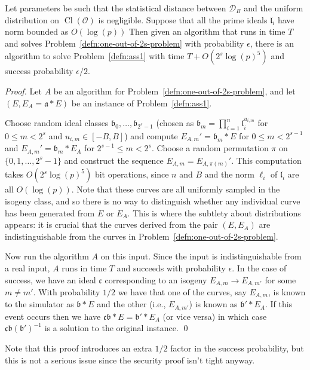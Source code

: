 \documentclass{llncs}
\newcommand{\D}{\mathcal{D}}
\newcommand{\OO}{\mathcal{O}}
\DeclareMathOperator{\Cl}{Cl}
\renewcommand{\a}{\mathfrak{a}}
\renewcommand{\b}{\mathfrak{b}}
\renewcommand{\c}{\mathfrak{c}}
\renewcommand{\l}{\mathfrak{l}}
\begin{document}
\begin{lemma}
Let parameters be such that the statistical distance between $\D_B$ and the uniform distribution on $\Cl(\OO)$ is negligible.
Suppose that all the prime ideals $\l_i$ have norm bounded as $O( \log(p) )$
Then given an algorithm that runs in time $T$ and solves Problem~\ref{defn:one-out-of-2s-problem} with probability $\epsilon$, there is an algorithm to solve Problem~\ref{defn:ass1} with time $T + O( 2^s \log(p)^5 )$ and success probability $\epsilon/2$.
\end{lemma}

\begin{proof}
Let $A$ be an algorithm for Problem~\ref{defn:one-out-of-2s-problem}, and let $(E, E_A = \a * E )$ be an instance of Problem~\ref{defn:ass1}.

Choose random ideal classes $\b_0, \dots, \b_{2^s-1}$
(chosen as $\b_m = \prod_{i=1}^n \l_i^{u_{i,m}}$ for $0 \le m < 2^s$ and $u_{i,m} \in [-B,B]$)
and compute $E_{A,m}' = \b_m * E$ for $0 \le m < 2^{s-1}$ and $E_{A,m}' = \b_m * E_A$ for $2^{s-1} \le m < 2^s$. Choose a random permutation $\pi$ on $\{ 0, 1, \dots, 2^s-1 \}$ and construct the sequence $E_{A,m} = E_{A,\pi(m)}'$.
This computation takes $O( 2^s \log(p)^5 )$ bit operations, since $n$ and $B$ and the norm $\ell_i$ of $\l_i$ are all $O( \log(p) )$.
Note that these curves are all uniformly sampled in the isogeny class, and so there is no way to distinguish whether any individual curve has been generated from $E$ or $E_A$.
This is where the subtlety about distributions appears: it is crucial that the curves derived from the pair $(E, E_A)$ are indistinguishable from the curves in Problem~\ref{defn:one-out-of-2s-problem}.

Now run the algorithm $A$ on this input. Since the input is indistinguishable from a real input, $A$ runs in time $T$ and succeeds with probability $\epsilon$.
In the case of success, we have an ideal $\c$ corresponding to an isogeny $E_{A,m} \to E_{A,m'}$ for some $m \ne m'$.
With probability $1/2$ we have that one of the curves, say $E_{A,m}$, is known to the simulator as  $\b * E$ and the other (i.e., $E_{A,m'}$) is known as $\b' * E_A$. If this event occurs then we have $\c \b * E = \b' * E_A$ (or vice versa) in which case $\c \b (\b')^{-1}$ is a solution to the original instance. \qed
\end{proof}


Note that this proof introduces an extra $1/2$ factor in the success probability, but this is not a serious issue since the security proof isn't tight anyway.
\end{document}
